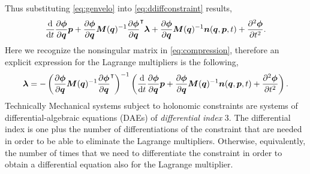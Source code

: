 Thus substituting \cref{eq:genvelo} into \cref{eq:ddiffconstraint} results,
\begin{equation}
	\frac{\mathop{}\!\mathrm{d}}{\mathop{}\!\mathrm{d} t}\frac{\partial\bm{\phi}}{\partial\bm{q}}\bm{p}
	+ \frac{\partial\bm{\phi}}{\partial\bm{q}}\bm{M}(\bm{q})^{-1}
	\frac{\partial\bm{\phi}}{\partial\bm{q}}^{\intercal}\bm{\lambda}
	+\frac{\partial\bm{\phi}}{\partial\bm{q}}\bm{M}(\bm{q})^{-1}
	\bm{n}(\bm{q},\bm{p},t)+\frac{\partial^{2}\bm{\phi}}{\partial t^{2}}.
\end{equation}
Here we recognize the nonsingular matrix in \cref{eq:compression},
therefore an explicit expression for the Lagrange multipliers is the following,
\begin{equation*}
	\bm{\lambda} = 
	-\left(\frac{\partial\bm{\phi}}{\partial\bm{q}}\bm{M}(\bm{q})^{-1}
	\frac{\partial\bm{\phi}}{\partial\bm{q}}^{\intercal}\right)^{-1}
	\left(\frac{\mathop{}\!\mathrm{d}}{\mathop{}\!\mathrm{d} t}\frac{\partial\bm{\phi}}{\partial\bm{q}}\bm{p}
	+\frac{\partial\bm{\phi}}{\partial\bm{q}}\bm{M}(\bm{q})^{-1}\bm{n}(\bm{q},\bm{p},t)
	+\frac{\partial^{2}\bm{\phi}}{\partial t^{2}}\right). 
\end{equation*}
Technically Mechanical systems subject to holonomic constraints are systems
of differential-algebraic equations (DAEs) of \emph{differential index} 3.
The differential index is one plus the number of differentiations of
the constraint that are needed in order to be able to eliminate the
Lagrange multipliers. Otherwise, equivalently, the number of times
that we need to differentiate the constraint in order to obtain a
differential equation also for the Lagrange multiplier. 








		
		
